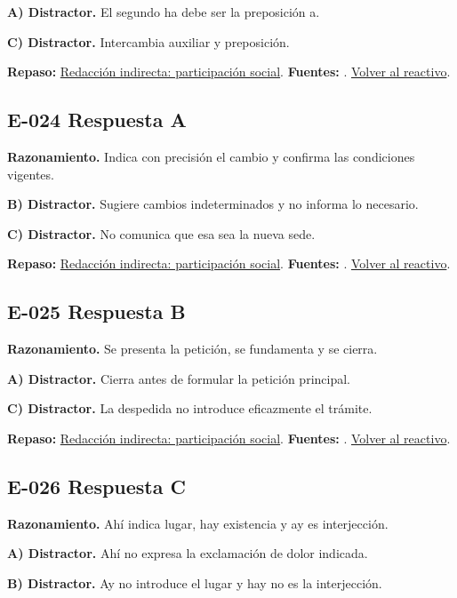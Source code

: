 \textbf{A) Distractor. }El segundo ha debe ser la preposición a.

\textbf{C) Distractor. }Intercambia auxiliar y preposición.

\textbf{Repaso:} \hyperref[sec:e2]{Redacción indirecta: participación social}. \textbf{Fuentes:} \cite{rae,writing}. \hyperref[q:E-023]{Volver al reactivo}.\par\medskip

\subsection*{E-024 \quad Respuesta A}\label{s:E-024}
\textbf{Razonamiento.} Indica con precisión el cambio y confirma las condiciones vigentes.

\textbf{B) Distractor. }Sugiere cambios indeterminados y no informa lo necesario.

\textbf{C) Distractor. }No comunica que esa sea la nueva sede.

\textbf{Repaso:} \hyperref[sec:e2]{Redacción indirecta: participación social}. \textbf{Fuentes:} \cite{rae,writing}. \hyperref[q:E-024]{Volver al reactivo}.\par\medskip

\subsection*{E-025 \quad Respuesta B}\label{s:E-025}
\textbf{Razonamiento.} Se presenta la petición, se fundamenta y se cierra.

\textbf{A) Distractor. }Cierra antes de formular la petición principal.

\textbf{C) Distractor. }La despedida no introduce eficazmente el trámite.

\textbf{Repaso:} \hyperref[sec:e2]{Redacción indirecta: participación social}. \textbf{Fuentes:} \cite{rae,writing}. \hyperref[q:E-025]{Volver al reactivo}.\par\medskip

\subsection*{E-026 \quad Respuesta C}\label{s:E-026}
\textbf{Razonamiento.} Ahí indica lugar, hay existencia y ay es interjección.

\textbf{A) Distractor. }Ahí no expresa la exclamación de dolor indicada.

\textbf{B) Distractor. }Ay no introduce el lugar y hay no es la interjección.

